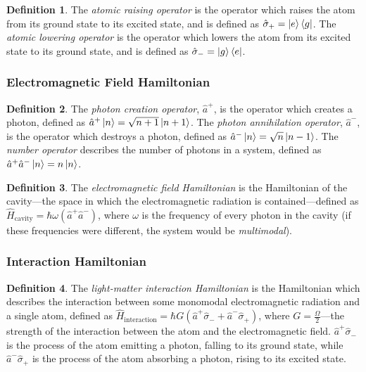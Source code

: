 \documentclass{article}
\theoremstyle{definition}
\newtheorem{definition}{Definition}[section]
\begin{document}
\begin{definition}
    The \emph{atomic raising operator} is the operator which raises the atom from its ground state to its excited state, and is defined as $\hat{\sigma}_{+} = \ket{e}\bra{g}$. The \emph{atomic lowering operator} is the operator which lowers the atom from its excited state to its ground state, and is defined as $\hat{\sigma}_{-} = \ket{g}\bra{e}$.
\end{definition}

\subsubsection{Electromagnetic Field Hamiltonian}
\begin{definition}
    The \emph{photon creation operator}, $\hat{a}^{+}$, is the operator which creates a photon, defined as $\hat{a}^{+}\ket{n} = \sqrt{n + 1}\ket{n + 1}$. The \emph{photon annihilation operator}, $\hat{a}^{-}$, is the operator which destroys a photon, defined as $\hat{a}^{-}\ket{n} = \sqrt{n}\ket{n-1}$. The \emph{number operator} describes the number of photons in a system, defined as $\hat{a}^{+}\hat{a}^{-}\ket{n} = n\ket{n}$.
\end{definition}

\begin{definition}
    The \emph{electromagnetic field Hamiltonian} is the Hamiltonian of the cavity---the space in which the electromagnetic radiation is contained---defined as $\hat{H}_{\text{cavity}} = \hbar \omega (\hat{a}^{+}\hat{a}^{-})$, where $\omega$ is the frequency of every photon in the cavity (if these frequencies were different, the system would be \emph{multimodal}).
\end{definition}

\subsubsection{Interaction Hamiltonian}
\begin{definition}
    The \emph{light-matter interaction Hamiltonian} is the Hamiltonian which describes the interaction between some monomodal electromagnetic radiation and a single atom, defined as $\hat{H}_{\text{interaction}} = \hbar G (\hat{a}^{+}\hat{\sigma}_{-} + \hat{a}^{-}\hat{\sigma}_{+})$, where $G = \frac{\Omega}{2}$---the strength of the interaction between the atom and the electromagnetic field. $\hat{a}^{+}\hat{\sigma}_{-}$ is the process of the atom emitting a photon, falling to its ground state, while $\hat{a}^{-}\hat{\sigma}_{+}$ is the process of the atom absorbing a photon, rising to its excited state.
\end{definition}
\end{document}
